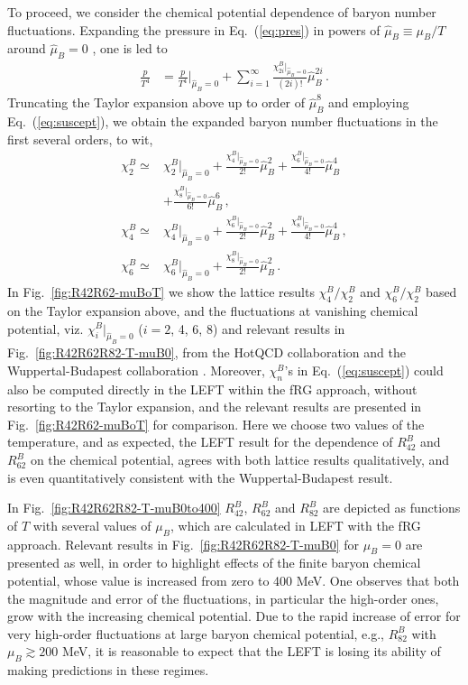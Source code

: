 \documentclass[%
reprint,
superscriptaddress,
showpacs,preprintnumbers,
 amsmath,amssymb,
 aps,
prd,
]{revtex4-1}
\def\Fig#1{Fig.~\ref{#1}} \def\Tab#1{Tab.~\ref{#1}}
\def\Eq#1{Eq.~(\ref{#1})}
\begin{document}
To proceed, we consider the chemical potential dependence of baryon number fluctuations. Expanding the pressure in \Eq{eq:pres} in powers of $\hat{\mu}_{B}\equiv\mu_B/T$ around $\hat{\mu}_{B}=0$ , one is led to 
%
\begin{align}
  \frac{p}{T^4}&=\frac{p}{T^4}\Big|_{\hat{\mu}_{B}=0}+\sum_{i=1}^{\infty}\frac{\chi^B_{2i}|_{\hat{\mu}_{B}=0}}{(2i)!}\hat{\mu}_{B}^{2i}\,.\label{eq:cmu}
\end{align}
%
Truncating the Taylor expansion above up to order of $\hat{\mu}_{B}^{8}$ and employing \Eq{eq:suscept}, we obtain the expanded baryon number fluctuations in the first several orders, to wit,
%
\begin{align}
\chi^B_2\simeq&\chi^B_2|_{\hat{\mu}_{B}=0}+\frac{\chi^B_4|_{\hat{\mu}_{B}=0}}{2!}\hat{\mu}_{B}^{2}+\frac{\chi^B_6|_{\hat{\mu}_{B}=0}}{4!}\hat{\mu}_{B}^{4}\nonumber\\[2ex]
&+\frac{\chi^B_8|_{\hat{\mu}_{B}=0}}{6!}\hat{\mu}_{B}^{6}\,,\label{}\\[2ex]
\chi^B_4\simeq&\chi^B_4|_{\hat{\mu}_{B}=0}+\frac{\chi^B_6|_{\hat{\mu}_{B}=0}}{2!}\hat{\mu}_{B}^{2}+\frac{\chi^B_8|_{\hat{\mu}_{B}=0}}{4!}\hat{\mu}_{B}^{4}\,,\\[2ex]
\chi^B_6\simeq&\chi^B_6|_{\hat{\mu}_{B}=0}+\frac{\chi^B_8|_{\hat{\mu}_{B}=0}}{2!}\hat{\mu}_{B}^{2}\,.\label{}
\end{align}
%
In \Fig{fig:R42R62-muBoT} we show the lattice results $\chi^B_4/\chi^B_2$ and $\chi^B_6/\chi^B_2$ based on the Taylor expansion above, and the fluctuations at vanishing chemical potential, viz. $\chi^B_{i}|_{\hat{\mu}_{B}=0}$ ($i=2$, 4, 6, 8) and relevant results in \Fig{fig:R42R62R82-T-muB0}, from the HotQCD collaboration \cite{Bazavov:2020bjn} and the Wuppertal-Budapest collaboration \cite{Borsanyi:2018grb}. Moreover, $\chi^B_n$'s in \Eq{eq:suscept} could also be computed directly in the LEFT within the fRG approach, without resorting to the Taylor expansion, and the relevant results are presented in \Fig{fig:R42R62-muBoT} for comparison. Here we choose two values of the temperature, and as expected, the LEFT result for the dependence of $R^{B}_{42}$ and $R^{B}_{62}$ on the chemical potential, agrees with both lattice results qualitatively, and is even quantitatively consistent with the Wuppertal-Budapest result.

In \Fig{fig:R42R62R82-T-muB0to400} $R^{B}_{42}$, $R^{B}_{62}$ and $R^{B}_{82}$ are depicted as functions of $T$ with several values of $\mu_B$, which are calculated in LEFT with the fRG approach. Relevant results in \Fig{fig:R42R62R82-T-muB0} for $\mu_B=0$ are presented as well, in order to highlight effects of the finite baryon chemical potential, whose value is increased from zero to 400 MeV. One observes that both the magnitude and error of the fluctuations, in particular the high-order ones, grow with the increasing chemical potential. Due to the rapid increase of error for very high-order fluctuations at large baryon chemical potential, e.g., $R^{B}_{82}$ with $\mu_B\gtrsim 200$ MeV, it is reasonable to expect that the LEFT is losing its ability of making predictions in these regimes.
\end{document}
